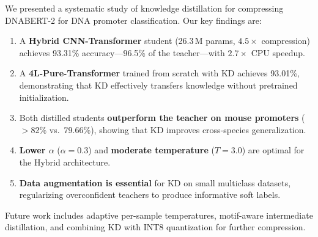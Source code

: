 \documentclass{article}
\begin{document}
We presented a systematic study of knowledge distillation for compressing DNABERT-2 for DNA promoter classification. Our key findings are:

\begin{enumerate}
    \item A \textbf{Hybrid CNN-Transformer} student (26.3\,M params, $4.5\times$ compression) achieves 93.31\% accuracy---96.5\% of the teacher---with $2.7\times$ CPU speedup.
    \item A \textbf{4L-Pure-Transformer} trained from scratch with KD achieves 93.01\%, demonstrating that KD effectively transfers knowledge without pretrained initialization.
    \item Both distilled students \textbf{outperform the teacher on mouse promoters} ($>$82\% vs.\ 79.66\%), showing that KD improves cross-species generalization.
    \item \textbf{Lower $\alpha$} ($\alpha\!=\!0.3$) and \textbf{moderate temperature} ($T\!=\!3.0$) are optimal for the Hybrid architecture.
    \item \textbf{Data augmentation is essential} for KD on small multiclass datasets, regularizing overconfident teachers to produce informative soft labels.
\end{enumerate}

Future work includes adaptive per-sample temperatures, motif-aware intermediate distillation, and combining KD with INT8 quantization for further compression.
\end{document}
